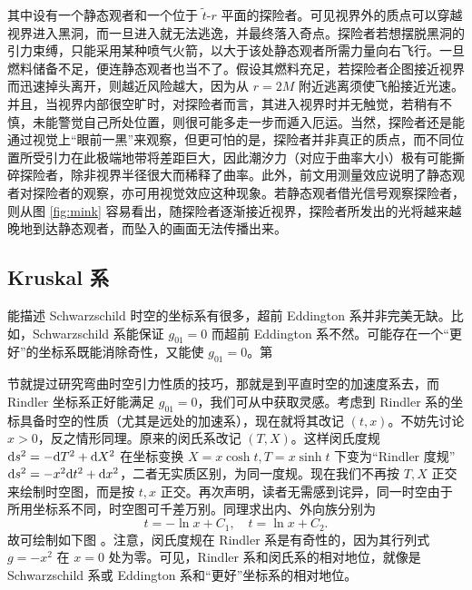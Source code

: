 其中设有一个静态观者和一个位于 $\tilde t$-$r$ 平面的探险者。可见视界外的质点可以穿越视界进入黑洞，而一旦进入就无法逃逸，并最终落入奇点。探险者若想摆脱黑洞的引力束缚，只能采用某种喷气火箭，以大于该处静态观者所需力量向右飞行。一旦燃料储备不足，便连静态观者也当不了。假设其燃料充足，若探险者企图接近视界而迅速掉头离开，则越近风险越大，因为从 $r=2M$ 附近逃离须使飞船接近光速。并且，当视界内部很空旷时，对探险者而言，其进入视界时并无触觉，若稍有不慎，未能警觉自己所处位置，则很可能多走一步而遁入厄运。当然，探险者还是能通过视觉上“眼前一黑”来观察，但更可怕的是，探险者并非真正的质点，而不同位置所受引力在此极端地带将差距巨大，因此潮汐力（对应于曲率大小）极有可能撕碎探险者，除非视界半径很大而稀释了曲率。此外，前文用测量效应说明了静态观者对探险者的观察，亦可用视觉效应这种现象。若静态观者借光信号观察探险者，则从图 \ref{fig:mink} 容易看出，随探险者逐渐接近视界，探险者所发出的光将越来越晚地到达静态观者，而坠入的画面无法传播出来。



\subsection{Kruskal 系}
能描述 Schwarzschild 时空的坐标系有很多，超前 Eddington 系并非完美无缺。比如，Schwarzschild 系能保证 $g_{01}=0$ 而超前 Eddington 系不然。可能存在一个“更好”的坐标系既能消除奇性，又能使 $g_{01}=0$。第 

节就提过研究弯曲时空引力性质的技巧，那就是到平直时空的加速度系去，而 Rindler 坐标系正好能满足 $g_{01}=0$，我们可从中获取灵感。考虑到 Rindler 系的坐标具备时空的性质（尤其是远处的加速系），现在就将其改记 $(t,x)$。不妨先讨论 $x>0$，反之情形同理。原来的闵氏系改记 $(T,X)$。这样闵氏度规 $\dd s^2=-\dd T^2+\dd X^2$ 在坐标变换 $X=x\cosh t,T=x\sinh t$ 下变为“Rindler 度规” $\dd s^2=-x^2\dd t^2+\dd x^2$，二者无实质区别，为同一度规。现在我们不再按 $T,X$ 正交来绘制时空图，而是按 $t,x$ 正交。再次声明，读者无需感到诧异，同一时空由于所用坐标系不同，时空图可千差万别。同理求出内、外向族分别为
\[
t=-\ln x+C_1,\quad t=\ln x+C_2.
\]
故可绘制如下图 。注意，闵氏度规在 Rindler 系是有奇性的，因为其行列式 $g=-x^2$ 在 $x=0$ 处为零。可见，Rindler 系和闵氏系的相对地位，就像是 Schwarzschild 系或 Eddington 系和“更好”坐标系的相对地位。


